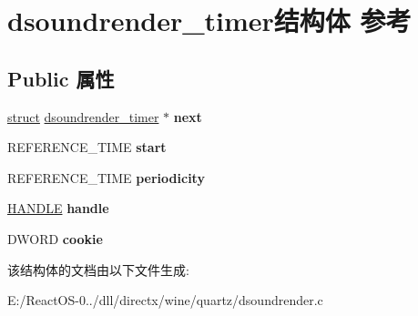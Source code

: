 \hypertarget{structdsoundrender__timer}{}\section{dsoundrender\+\_\+timer结构体 参考}
\label{structdsoundrender__timer}
\subsection*{Public 属性}
\begin{DoxyCompactItemize}
\item 
\mbox{\label{structdsoundrender__timer_a4e573a94ef4112ce4003ba3af2b42836}} 
\hyperlink{interfacestruct}{struct} \hyperlink{structdsoundrender__timer}{dsoundrender\+\_\+timer} $\ast$ {\bfseries next}
\item 
\mbox{\label{structdsoundrender__timer_a19219ca706ebab124e45b954a49dc511}} 
R\+E\+F\+E\+R\+E\+N\+C\+E\+\_\+\+T\+I\+ME {\bfseries start}
\item 
\mbox{\label{structdsoundrender__timer_aaceb7413d50d912faa2fa0c8b284951d}} 
R\+E\+F\+E\+R\+E\+N\+C\+E\+\_\+\+T\+I\+ME {\bfseries periodicity}
\item 
\mbox{\label{structdsoundrender__timer_a77aeb1ef9ef364f14405eb47d3cbf7c7}} 
\hyperlink{interfacevoid}{H\+A\+N\+D\+LE} {\bfseries handle}
\item 
\mbox{\label{structdsoundrender__timer_a423b8929b5f341f20e56269665315f02}} 
D\+W\+O\+RD {\bfseries cookie}
\end{DoxyCompactItemize}


该结构体的文档由以下文件生成\+:\begin{DoxyCompactItemize}
\item 
E\+:/\+React\+O\+S-\/0../dll/directx/wine/quartz/dsoundrender.\+c\end{DoxyCompactItemize}
